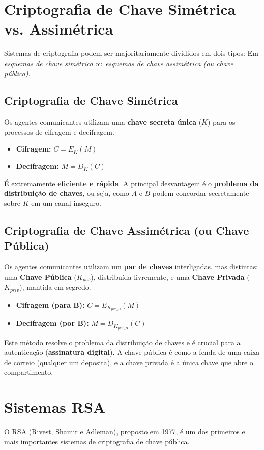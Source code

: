 \documentclass{article}
\theoremstyle{definicao_estilo}
\begin{document}
\section{Criptografia de Chave Simétrica vs. Assimétrica}
Sistemas de criptografia podem ser majoritariamente divididos em dois tipos: Em \textit{esquemas de chave simétrica} ou \textit{esquemas de chave assimétrica (ou chave pública)}.

\subsection{Criptografia de Chave Simétrica}
Os agentes comunicantes utilizam uma \textbf{chave secreta única} ($K$) para os processos de cifragem e decifragem.
\begin{itemize}
\item \textbf{Cifragem:} $C = E_K(M)$
\item \textbf{Decifragem:} $M = D_K(C)$
\end{itemize}
É extremamente \textbf{eficiente e rápida}. A principal desvantagem é o \textbf{problema da distribuição de chaves}, ou seja, como $A$ e $B$ podem concordar secretamente sobre $K$ em um canal inseguro.

\subsection{Criptografia de Chave Assimétrica (ou Chave Pública)}
Os agentes comunicantes utilizam um \textbf{par de chaves} interligadas, mas distintas: uma \textbf{Chave Pública} ($K_{pub}$), distribuída livremente, e uma \textbf{Chave Privada} ($K_{priv}$), mantida em segredo.
\begin{itemize}
\item \textbf{Cifragem (para B):} $C = E_{K_{pub\_B}}(M)$
\item \textbf{Decifragem (por B):} $M = D_{K_{priv\_B}}(C)$
\end{itemize}
Este método resolve o problema da distribuição de chaves e é crucial para a autenticação (\textbf{assinatura digital}). A chave pública é como a fenda de uma caixa de correio (qualquer um deposita), e a chave privada é a única chave que abre o compartimento.

\section{Sistemas RSA}
O RSA (Rivest, Shamir e Adleman), proposto em 1977, é um dos primeiros e mais importantes sistemas de criptografia de chave pública.
\end{document}
